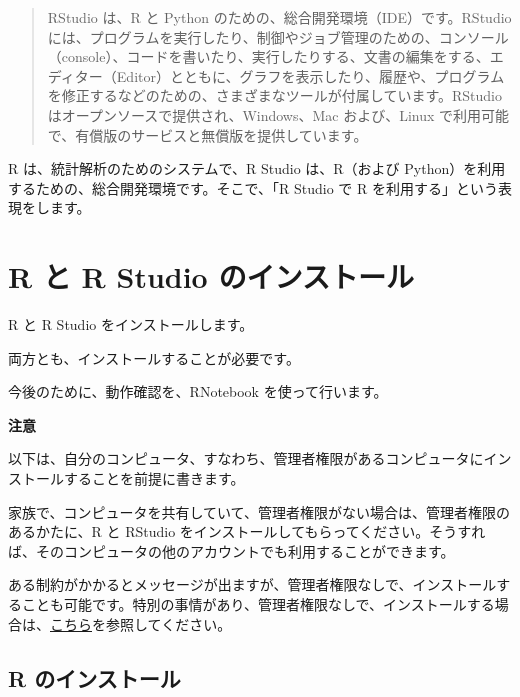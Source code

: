 \documentclass[
  xelatex, ja=standard]{bxjsbook}
\theoremstyle{definition}
\theoremstyle{definition}
\theoremstyle{definition}
\theoremstyle{definition}
\theoremstyle{remark}
\begin{document}
\begin{quote}
RStudio は、R と Python のための、総合開発環境（IDE）です。RStudio には、プログラムを実行したり、制御やジョブ管理のための、コンソール（console）、コードを書いたり、実行したりする、文書の編集をする、エディター（Editor）とともに、グラフを表示したり、履歴や、プログラムを修正するなどのための、さまざまなツールが付属しています。RStudio はオープンソースで提供され、Windows、Mac および、Linux で利用可能で、有償版のサービスと無償版を提供しています。
\end{quote}

R は、統計解析のためのシステムで、R Studio は、R（および Python）を利用するための、総合開発環境です。そこで、「R Studio で R を利用する」という表現をします。

\hypertarget{r-ux3068-r-studio-ux306eux30a4ux30f3ux30b9ux30c8ux30fcux30eb}{%
\section{R と R Studio のインストール}\label{r-ux3068-r-studio-ux306eux30a4ux30f3ux30b9ux30c8ux30fcux30eb}}

R と R Studio をインストールします。

両方とも、インストールすることが必要です。

今後のために、動作確認を、RNotebook を使って行います。

\textbf{注意}

以下は、自分のコンピュータ、すなわち、管理者権限があるコンピュータにインストールすることを前提に書きます。

家族で、コンピュータを共有していて、管理者権限がない場合は、管理者権限のあるかたに、R と RStudio をインストールしてもらってください。そうすれば、そのコンピュータの他のアカウントでも利用することができます。

ある制約がかかるとメッセージが出ますが、管理者権限なしで、インストールすることも可能です。特別の事情があり、管理者権限なしで、インストールする場合は、\href{https://icu-hsuzuki.github.io/myds/techmemo.html\#\%E9\%9D\%9E\%E7\%AE\%A1\%E7\%90\%86\%E8\%80\%85\%E3\%81\%A8\%E3\%81\%97\%E3\%81\%A6-r-\%E3\%81\%A8-rstudio-\%E3\%82\%92\%E3\%82\%A4\%E3\%83\%B3\%E3\%82\%B9\%E3\%83\%88\%E3\%83\%BC\%E3\%83\%AB}{こちら}を参照してください。

\hypertarget{r-ux306eux30a4ux30f3ux30b9ux30c8ux30fcux30eb}{%
\subsection{R のインストール}\label{r-ux306eux30a4ux30f3ux30b9ux30c8ux30fcux30eb}}
\end{document}
